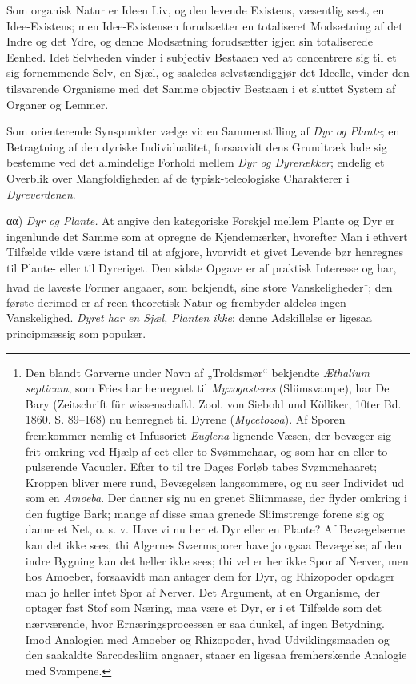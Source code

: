 \documentclass[11pt]{book}
\newcommand{\opage}[1]{\marginnote{\footnotesize\textit{[#1]}}}
\begin{document}
Som organisk Natur er Ideen Liv, og den levende Existens, væsentlig seet, en
Idee-Existens; men Idee-Existensen
\opage{329} \setcounter{footnote}{0}%
forudsætter en totaliseret Modsætning af det Indre og det Ydre, og denne
Modsætning forudsætter igjen sin totaliserede Eenhed. Idet Selvheden vinder i
subjectiv Bestaaen ved at concentrere sig til et sig fornemmende Selv, en
Sjæl, og saaledes selvstændiggjør det Ideelle, vinder den tilsvarende
Organisme med det Samme objectiv Bestaaen i et sluttet System af Organer og
Lemmer.

Som orienterende Synspunkter vælge vi: en Sammenstilling af \emph{Dyr og
Plante}; en Betragtning af den dyriske Individualitet, forsaavidt dens
Grundtræk lade sig bestemme ved det almindelige Forhold mellem \emph{Dyr og
Dyrerækker}; endelig et Overblik over Mangfoldigheden af de typisk-teleologiske
Charakterer i \emph{Dyreverdenen}.

αα) \emph{Dyr og Plante.} At angive den kategoriske Forskjel mellem Plante og
Dyr er ingenlunde det Samme som at opregne de Kjendemærker, hvorefter Man i
ethvert Tilfælde vilde være istand til at afgjore,
hvorvidt et givet Levende bør henregnes til Plante- eller til Dyreriget. Den
sidste Opgave er af praktisk Interesse og har, hvad de laveste Former angaaer,
som bekjendt, sine store Vanskeligheder\footnote{%
Den blandt Garverne under Navn af „Troldsmør“ bekjendte \textit{Æthalium
septicum}, som Fries har henregnet til \textit{Myxogasteres} (Sliimsvampe),
har De Bary (Zeitschrift für wissenschaftl. Zool. von Siebold und Kölliker,
10ter Bd. 1860. S. 89--168) nu henregnet til Dyrene (\textit{Mycetozoa}). Af
Sporen fremkommer nemlig et Infusoriet \textit{Euglena} lignende Væsen, der
bevæger sig frit omkring ved Hjælp af eet eller to Svømmehaar, og som har en
eller to pulserende Vacuoler. Efter to til tre Dages Forløb tabes
Svømmehaaret; Kroppen bliver mere rund, Bevægelsen langsommere, og nu seer
Individet ud som en \textit{Amoeba}. Der danner sig nu en grenet Sliimmasse,
der flyder omkring i den fugtige Bark; mange af disse smaa grenede
Sliimstrenge forene sig og danne et Net, o. s. v. Have vi nu her et Dyr eller
en Plante? Af Bevægelserne kan det ikke sees, thi Algernes Sværmsporer have
jo ogsaa Bevægelse; af den indre Bygning kan det heller ikke
sees; thi vel er her ikke Spor af Nerver, men hos Amoeber, forsaavidt man
antager dem for Dyr, og Rhizopoder opdager man jo heller intet Spor af
Nerver. Det Argument, at en Organisme, der optager fast Stof som Næring, maa
være et Dyr, er i et Tilfælde som det nærværende, hvor Ernæringsprocessen er
saa dunkel, af ingen Betydning. Imod Analogien med Amoeber og Rhizopoder,
hvad Udviklingsmaaden og den saakaldte Sarcodesliim angaaer, staaer en
ligesaa fremherskende Analogie med Svampene.};
\opage{330} \setcounter{footnote}{0}%
den første derimod er af reen theoretisk Natur og frembyder aldeles ingen
Vanskelighed. \emph{Dyret har en Sjæl, Planten ikke}; denne Adskillelse er
ligesaa principmæssig som populær.
\end{document}
